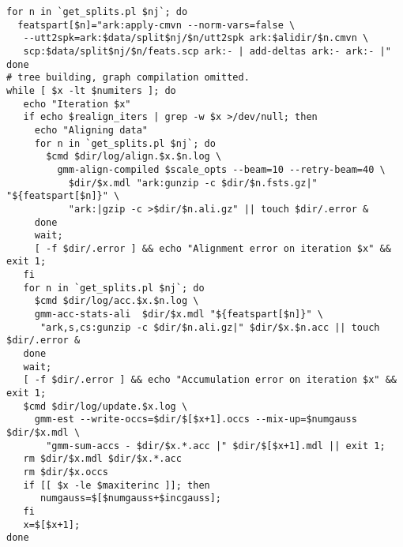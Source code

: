 \documentclass{article}
\begin{document}
\begin{verbatim}
for n in `get_splits.pl $nj`; do
  featspart[$n]="ark:apply-cmvn --norm-vars=false \
   --utt2spk=ark:$data/split$nj/$n/utt2spk ark:$alidir/$n.cmvn \
   scp:$data/split$nj/$n/feats.scp ark:- | add-deltas ark:- ark:- |"
done
# tree building, graph compilation omitted.
while [ $x -lt $numiters ]; do
   echo "Iteration $x"
   if echo $realign_iters | grep -w $x >/dev/null; then
     echo "Aligning data"
     for n in `get_splits.pl $nj`; do
       $cmd $dir/log/align.$x.$n.log \
         gmm-align-compiled $scale_opts --beam=10 --retry-beam=40 \
           $dir/$x.mdl "ark:gunzip -c $dir/$n.fsts.gz|" "${featspart[$n]}" \
           "ark:|gzip -c >$dir/$n.ali.gz" || touch $dir/.error &
     done
     wait;
     [ -f $dir/.error ] && echo "Alignment error on iteration $x" && exit 1;
   fi
   for n in `get_splits.pl $nj`; do
     $cmd $dir/log/acc.$x.$n.log \
     gmm-acc-stats-ali  $dir/$x.mdl "${featspart[$n]}" \
      "ark,s,cs:gunzip -c $dir/$n.ali.gz|" $dir/$x.$n.acc || touch $dir/.error &
   done
   wait;
   [ -f $dir/.error ] && echo "Accumulation error on iteration $x" && exit 1;
   $cmd $dir/log/update.$x.log \
     gmm-est --write-occs=$dir/$[$x+1].occs --mix-up=$numgauss $dir/$x.mdl \
       "gmm-sum-accs - $dir/$x.*.acc |" $dir/$[$x+1].mdl || exit 1;
   rm $dir/$x.mdl $dir/$x.*.acc
   rm $dir/$x.occs 
   if [[ $x -le $maxiterinc ]]; then 
      numgauss=$[$numgauss+$incgauss];
   fi
   x=$[$x+1];
done
\end{verbatim}
\vspace{0.4in}
\end{document}

